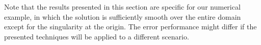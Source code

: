 Note that the results presented in this section are specific for our numerical example, in which the solution is sufficiently smooth over the entire domain except for the singularity at the origin. The error performance might differ if the presented techniques will be applied to a different scenario.



